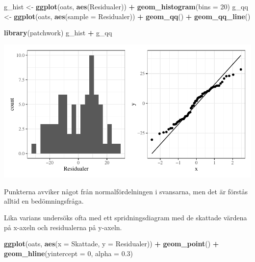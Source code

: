 \documentclass[
]{book}
\newenvironment{Shaded}{\begin{snugshade}}{\end{snugshade}}
\newcommand{\AttributeTok}[1]{\textcolor[rgb]{0.13,0.29,0.53}{#1}}
\newcommand{\DecValTok}[1]{\textcolor[rgb]{0.00,0.00,0.81}{#1}}
\newcommand{\FloatTok}[1]{\textcolor[rgb]{0.00,0.00,0.81}{#1}}
\newcommand{\FunctionTok}[1]{\textcolor[rgb]{0.13,0.29,0.53}{\textbf{#1}}}
\newcommand{\NormalTok}[1]{#1}
\newcommand{\OtherTok}[1]{\textcolor[rgb]{0.56,0.35,0.01}{#1}}
\newcommand{\SpecialCharTok}[1]{\textcolor[rgb]{0.81,0.36,0.00}{\textbf{#1}}}
\theoremstyle{definition}
\theoremstyle{definition}
\theoremstyle{definition}
\theoremstyle{definition}
\theoremstyle{remark}
\begin{document}
\begin{Shaded}
\begin{Highlighting}[]
\NormalTok{g\_hist }\OtherTok{\textless{}{-}} \FunctionTok{ggplot}\NormalTok{(oats, }\FunctionTok{aes}\NormalTok{(Residualer)) }\SpecialCharTok{+} \FunctionTok{geom\_histogram}\NormalTok{(}\AttributeTok{bins =} \DecValTok{20}\NormalTok{)}
\NormalTok{g\_qq }\OtherTok{\textless{}{-}} \FunctionTok{ggplot}\NormalTok{(oats, }\FunctionTok{aes}\NormalTok{(}\AttributeTok{sample =}\NormalTok{ Residualer)) }\SpecialCharTok{+} \FunctionTok{geom\_qq}\NormalTok{() }\SpecialCharTok{+} \FunctionTok{geom\_qq\_line}\NormalTok{()}

\FunctionTok{library}\NormalTok{(patchwork)}
\NormalTok{g\_hist }\SpecialCharTok{+}\NormalTok{ g\_qq}
\end{Highlighting}
\end{Shaded}

\begin{center}\includegraphics{R-anvisningar_files/figure-latex/unnamed-chunk-241-1} \end{center}

Punkterna avviker något från normalfördelningen i svansarna, men det är förstås alltid en bedömningsfråga.

Lika varians undersöks ofta med ett spridningsdiagram med de skattade värdena på x-axeln och residualerna på y-axeln.

\begin{Shaded}
\begin{Highlighting}[]
\FunctionTok{ggplot}\NormalTok{(oats, }\FunctionTok{aes}\NormalTok{(}\AttributeTok{x =}\NormalTok{ Skattade, }\AttributeTok{y =}\NormalTok{ Residualer)) }\SpecialCharTok{+}
  \FunctionTok{geom\_point}\NormalTok{() }\SpecialCharTok{+}
  \FunctionTok{geom\_hline}\NormalTok{(}\AttributeTok{yintercept =} \DecValTok{0}\NormalTok{, }\AttributeTok{alpha =} \FloatTok{0.3}\NormalTok{)}
\end{Highlighting}
\end{Shaded}
\end{document}
